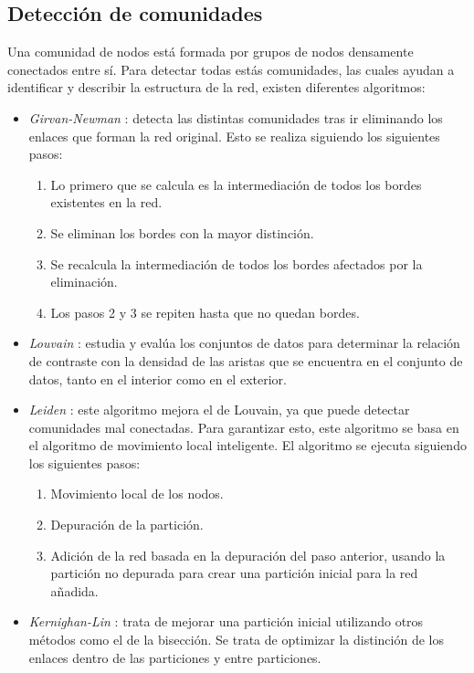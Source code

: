 \subsection{Detección de comunidades}
Una comunidad de nodos está formada por grupos de nodos densamente conectados entre sí. Para detectar todas estás comunidades, las cuales ayudan a identificar y describir la estructura de la red, existen diferentes algoritmos:
\begin{itemize}
    \item \textit{Girvan-Newman} \cite{wiki:girvanNewman}: detecta las distintas comunidades tras ir eliminando los enlaces que forman la red original. Esto se realiza siguiendo los siguientes pasos:
    \begin{enumerate}
        \item Lo primero que se calcula es la intermediación de todos los bordes existentes en la red.
        \item Se eliminan los bordes con la mayor distinción.
        \item Se recalcula la intermediación de todos los bordes afectados por la eliminación.
        \item Los pasos 2 y 3 se repiten hasta que no quedan bordes.
    \end{enumerate}
    
    \item \textit{Louvain} \cite{wiki:louvain}: estudia y evalúa los conjuntos de datos para determinar la relación de contraste con la densidad de las aristas que se encuentra en el conjunto de datos, tanto en el interior como en el exterior.
    
    \item \textit{Leiden} \cite{wiki:leiden}: este algoritmo mejora el de Louvain, ya que puede detectar comunidades mal conectadas. Para garantizar esto, este algoritmo se basa en el algoritmo de movimiento local inteligente. El algoritmo se ejecuta siguiendo los siguientes pasos:
    \begin{enumerate}
        \item Movimiento local de los nodos.
        \item Depuración de la partición.
        \item Adición de la red basada en la depuración del paso anterior, usando la partición no depurada para crear una partición inicial para la red añadida.
    \end{enumerate}
    
    \item \textit{Kernighan-Lin} \cite{wiki:kernighan}: trata de mejorar una partición inicial utilizando otros métodos como el de la bisección. Se trata de optimizar la distinción de los enlaces dentro de las particiones y entre particiones.
\end{itemize}

